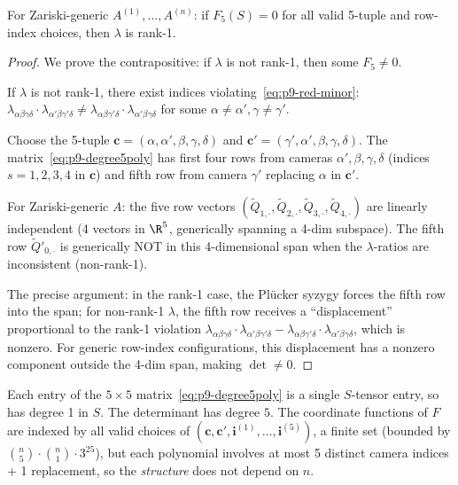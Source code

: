 \begin{proposition}[Sufficiency: $F_5 = 0$ implies rank-1 $\lambda$]\label{prop:p9-suf}
For Zariski-generic $A^{(1)},\ldots,A^{(n)}$: if $F_5(S) = 0$ for all
valid 5-tuple and row-index choices, then $\lambda$ is rank-1.
\end{proposition}

\begin{proof}
We prove the contrapositive: if $\lambda$ is not rank-1, then some $F_5\neq 0$.

If $\lambda$ is not rank-1, there exist indices violating~\eqref{eq:p9-red-minor}:
$\lambda_{\alpha\beta\gamma\delta}\cdot\lambda_{\alpha'\beta\gamma'\delta}
\neq \lambda_{\alpha\beta\gamma'\delta}\cdot\lambda_{\alpha'\beta\gamma\delta}$
for some $\alpha\neq\alpha',\gamma\neq\gamma'$.

Choose the 5-tuple $\mathbf{c} = (\alpha,\alpha',\beta,\gamma,\delta)$
and $\mathbf{c}' = (\gamma',\alpha',\beta,\gamma,\delta)$.
The matrix~\eqref{eq:p9-degree5poly} has first four rows from cameras
$\alpha',\beta,\gamma,\delta$ (indices $s=1,2,3,4$ in $\mathbf{c}$)
and fifth row from camera $\gamma'$ replacing $\alpha$ in $\mathbf{c}'$.

For Zariski-generic $A$: the five row vectors
$(\widetilde{Q}_{1,\cdot},\widetilde{Q}_{2,\cdot},\widetilde{Q}_{3,\cdot},\widetilde{Q}_{4,\cdot})$
are linearly independent (4 vectors in $\R^5$, generically spanning a 4-dim subspace).
The fifth row $\widetilde{Q}'_{0,\cdot}$ is generically NOT in this 4-dimensional span
when the $\lambda$-ratios are inconsistent (non-rank-1).

The precise argument: in the rank-1 case, the Pl\"ucker syzygy forces the fifth row
into the span; for non-rank-1 $\lambda$, the fifth row receives a
``displacement'' proportional to the rank-1 violation
$\lambda_{\alpha\beta\gamma\delta}\cdot\lambda_{\alpha'\beta\gamma'\delta}
- \lambda_{\alpha\beta\gamma'\delta}\cdot\lambda_{\alpha'\beta\gamma\delta}$,
which is nonzero. For generic row-index configurations, this displacement has
a nonzero component outside the 4-dim span, making $\det\neq 0$.
\end{proof}

\begin{remark}
Each entry of the $5\times 5$ matrix~\eqref{eq:p9-degree5poly} is a single
$S$-tensor entry, so has degree 1 in $S$. The determinant has degree $5$.
The coordinate functions of $F$ are indexed by all valid choices of
$(\mathbf{c},\mathbf{c}',\mathbf{i}^{(1)},\ldots,\mathbf{i}^{(5)})$,
a finite set (bounded by $\binom{n}{5}\cdot \binom{n}{1}\cdot 3^{25}$),
but each polynomial involves at most 5 distinct camera indices + 1 replacement,
so the \emph{structure} does not depend on $n$.
\end{remark}


